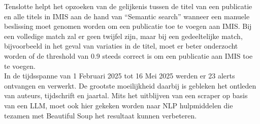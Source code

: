 Tenslotte helpt het opzoeken van de gelijkenis tussen de titel van een publicatie en alle titels in IMIS aan de hand van ``Semantic search'' wanneer een manuele beslissing moet genomen worden om een publicatie toe te voegen aan IMIS. Bij een volledige match zal er geen twijfel zijn, maar bij een gedeeltelijke match, bijvoorbeeld in het geval van variaties in de titel, moet er beter onderzocht worden of de threshold van 0.9 steeds correct is om een publicatie aan IMIS toe te voegen.\\
In de tijdsspanne van 1 Februari 2025 tot 16 Mei 2025 werden er 23 alerts ontvangen en verwerkt. De grootste moeilijkheid daarbij is gebleken het ontleden van auteurs, tijdschrift en jaartal. Mits het uitblijven van een scraper op basis van een LLM, moet ook hier gekeken worden naar NLP hulpmiddelen die tezamen met Beautiful Soup het resultaat kunnen verbeteren.

